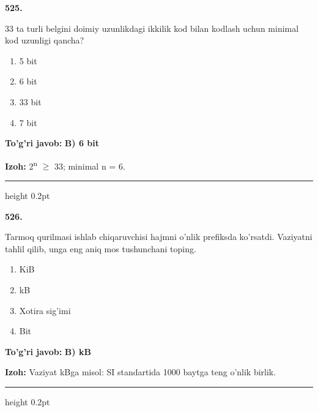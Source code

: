 \documentclass[10pt,a4paper,oneside]{article}
\begin{document}
\noindent\textbf{\color{ink}525.}
\par
33 ta turli belgini doimiy uzunlikdagi ikkilik kod bilan kodlash uchun minimal kod uzunligi qancha?
\begin{enumerate}[label=\Alph*),leftmargin=9mm]
\item 5 bit
\item 6 bit
\item 33 bit
\item 7 bit
\end{enumerate}
\begin{tcolorbox}[enhanced,breakable,colback=teal!4,colframe=teal!50!black,boxrule=0.5pt,arc=1.1mm,left=3mm,right=3mm,top=1.7mm,bottom=1.7mm,before skip=2mm,after skip=2mm]
\textbf{\color{teal}To'g'ri javob:} \textbf{B) 6 bit}
\par\smallskip
\textbf{Izoh:} 2\textsuperscript{n} \ensuremath{\geq} 33; minimal n = 6.
\end{tcolorbox}
\vspace{2mm}\hrule height 0.2pt \vspace{3mm}

\noindent\textbf{\color{ink}526.}
\par
Tarmoq qurilmasi ishlab chiqaruvchisi hajmni o'nlik prefiksda ko'rsatdi. Vaziyatni tahlil qilib, unga eng aniq mos tushunchani toping.
\begin{enumerate}[label=\Alph*),leftmargin=9mm]
\item KiB
\item kB
\item Xotira sig'imi
\item Bit
\end{enumerate}
\begin{tcolorbox}[enhanced,breakable,colback=teal!4,colframe=teal!50!black,boxrule=0.5pt,arc=1.1mm,left=3mm,right=3mm,top=1.7mm,bottom=1.7mm,before skip=2mm,after skip=2mm]
\textbf{\color{teal}To'g'ri javob:} \textbf{B) kB}
\par\smallskip
\textbf{Izoh:} Vaziyat kBga misol: SI standartida 1000 baytga teng o'nlik birlik.
\end{tcolorbox}
\vspace{2mm}\hrule height 0.2pt \vspace{3mm}
\end{document}
